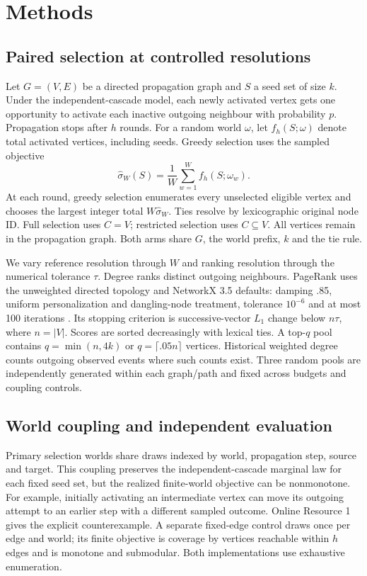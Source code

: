 \documentclass[smallextended]{svjour3}
\begin{document}
\section{Methods}
\subsection{Paired selection at controlled resolutions}
Let $G=(V,E)$ be a directed propagation graph and $S$ a seed set of size $k$. Under the independent-cascade model, each newly activated vertex gets one opportunity to activate each inactive outgoing neighbour with probability $p$. Propagation stops after $h$ rounds. For a random world $\omega$, let $f_h(S;\omega)$ denote total activated vertices, including seeds. Greedy selection uses the sampled objective
\begin{equation}
\widehat\sigma_W(S)=\frac{1}{W}\sum_{w=1}^{W}f_h(S;\omega_w).
\end{equation}
At each round, greedy selection enumerates every unselected eligible vertex and chooses the largest integer total $W\widehat\sigma_W$. Ties resolve by lexicographic original node ID. Full selection uses $C=V$; restricted selection uses $C\subseteq V$. All vertices remain in the propagation graph. Both arms share $G$, the world prefix, $k$ and the tie rule.

We vary reference resolution through $W$ and ranking resolution through the numerical tolerance $\tau$. Degree ranks distinct outgoing neighbours. PageRank uses the unweighted directed topology and NetworkX 3.5 defaults: damping .85, uniform personalization and dangling-node treatment, tolerance $10^{-6}$ and at most 100 iterations \cite{networkxpr}. Its stopping criterion is successive-vector $L_1$ change below $n\tau$, where $n=|V|$. Scores are sorted decreasingly with lexical ties. A top-$q$ pool contains $q=\min(n,4k)$ or $q=\lceil .05n\rceil$ vertices. Historical weighted degree counts outgoing observed events where such counts exist. Three random pools are independently generated within each graph/path and fixed across budgets and coupling controls.

\subsection{World coupling and independent evaluation}\label{sec:coupling}
Primary selection worlds share draws indexed by world, propagation step, source and target. This coupling preserves the independent-cascade marginal law for each fixed seed set, but the realized finite-world objective can be nonmonotone. For example, initially activating an intermediate vertex can move its outgoing attempt to an earlier step with a different sampled outcome. Online Resource 1 gives the explicit counterexample. A separate fixed-edge control draws once per edge and world; its finite objective is coverage by vertices reachable within $h$ edges and is monotone and submodular. Both implementations use exhaustive enumeration.
\end{document}
